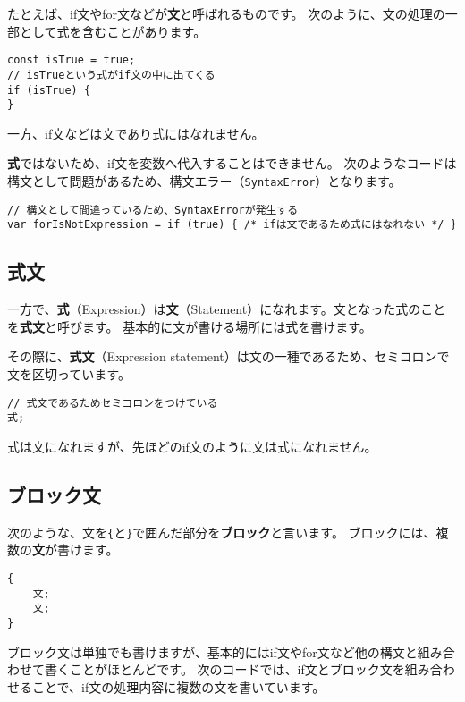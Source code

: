 たとえば、if文やfor文などが\textbf{文}と呼ばれるものです。
次のように、文の処理の一部として式を含むことがあります。

\begin{lstlisting}
const isTrue = true;
// isTrueという式がif文の中に出てくる
if (isTrue) {
}
\end{lstlisting}

一方、if文などは文であり式にはなれません。

\textbf{式}ではないため、if文を変数へ代入することはできません。
次のようなコードは構文として問題があるため、構文エラー（\texttt{SyntaxError}）となります。

\begin{lstlisting}
// 構文として間違っているため、SyntaxErrorが発生する
var forIsNotExpression = if (true) { /* ifは文であるため式にはなれない */ }
\end{lstlisting}

\hypertarget{expression-statement}{%
\subsection{式文}\label{expression-statement}}

一方で、\textbf{式}（Expression）は\textbf{文}（Statement）になれます。文となった式のことを\textbf{式文}と呼びます。
基本的に文が書ける場所には式を書けます。

その際に、\textbf{式文}（Expression
statement）は文の一種であるため、セミコロンで文を区切っています。

\begin{lstlisting}
// 式文であるためセミコロンをつけている
式;
\end{lstlisting}

式は文になれますが、先ほどのif文のように文は式になれません。

\hypertarget{block-statement}{%
\subsection{ブロック文}\label{block-statement}}

次のような、文を\texttt{\{}と\texttt{\}}で囲んだ部分を\textbf{ブロック}と言います。
ブロックには、複数の\textbf{文}が書けます。

\begin{lstlisting}
{
    文;
    文;
}
\end{lstlisting}

ブロック文は単独でも書けますが、基本的にはif文やfor文など他の構文と組み合わせて書くことがほとんどです。
次のコードでは、if文とブロック文を組み合わせることで、if文の処理内容に複数の文を書いています。

